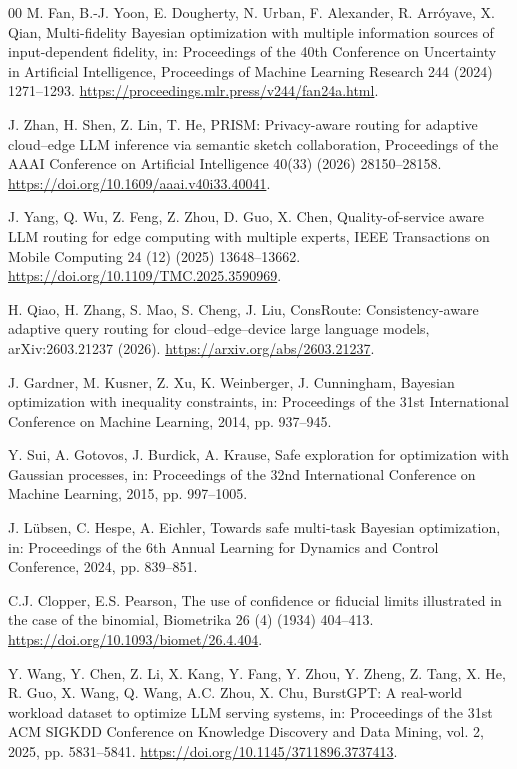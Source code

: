 \documentclass[preprint,12pt]{elsarticle}
\begin{document}
\begin{thebibliography}{00}
M. Fan, B.-J. Yoon, E. Dougherty, N. Urban, F. Alexander, R. Arr\'oyave, X. Qian,
Multi-fidelity Bayesian optimization with multiple information sources of input-dependent fidelity,
in: Proceedings of the 40th Conference on Uncertainty in Artificial Intelligence,
Proceedings of Machine Learning Research 244 (2024) 1271--1293.
\newblock \url{https://proceedings.mlr.press/v244/fan24a.html}.

J. Zhan, H. Shen, Z. Lin, T. He,
PRISM: Privacy-aware routing for adaptive cloud--edge LLM inference via semantic sketch collaboration,
Proceedings of the AAAI Conference on Artificial Intelligence 40(33) (2026) 28150--28158.
\newblock \url{https://doi.org/10.1609/aaai.v40i33.40041}.

J. Yang, Q. Wu, Z. Feng, Z. Zhou, D. Guo, X. Chen,
Quality-of-service aware LLM routing for edge computing with multiple experts,
IEEE Transactions on Mobile Computing 24 (12) (2025) 13648--13662.
\newblock \url{https://doi.org/10.1109/TMC.2025.3590969}.

H. Qiao, H. Zhang, S. Mao, S. Cheng, J. Liu,
ConsRoute: Consistency-aware adaptive query routing for cloud--edge--device large language models,
arXiv:2603.21237 (2026).
\newblock \url{https://arxiv.org/abs/2603.21237}.


J. Gardner, M. Kusner, Z. Xu, K. Weinberger, J. Cunningham,
Bayesian optimization with inequality constraints,
in: Proceedings of the 31st International Conference on Machine Learning, 2014, pp. 937--945.

Y. Sui, A. Gotovos, J. Burdick, A. Krause,
Safe exploration for optimization with Gaussian processes,
in: Proceedings of the 32nd International Conference on Machine Learning, 2015, pp. 997--1005.

J. L{\"u}bsen, C. Hespe, A. Eichler,
Towards safe multi-task Bayesian optimization,
in: Proceedings of the 6th Annual Learning for Dynamics and Control Conference, 2024, pp. 839--851.

C.J. Clopper, E.S. Pearson,
The use of confidence or fiducial limits illustrated in the case of the binomial,
Biometrika 26 (4) (1934) 404--413.
\newblock \url{https://doi.org/10.1093/biomet/26.4.404}.

Y. Wang, Y. Chen, Z. Li, X. Kang, Y. Fang, Y. Zhou, Y. Zheng, Z. Tang,
X. He, R. Guo, X. Wang, Q. Wang, A.C. Zhou, X. Chu,
BurstGPT: A real-world workload dataset to optimize LLM serving systems,
in: Proceedings of the 31st ACM SIGKDD Conference on Knowledge Discovery and Data Mining, vol. 2, 2025, pp. 5831--5841.
\newblock \url{https://doi.org/10.1145/3711896.3737413}.

\end{thebibliography}
\end{document}

